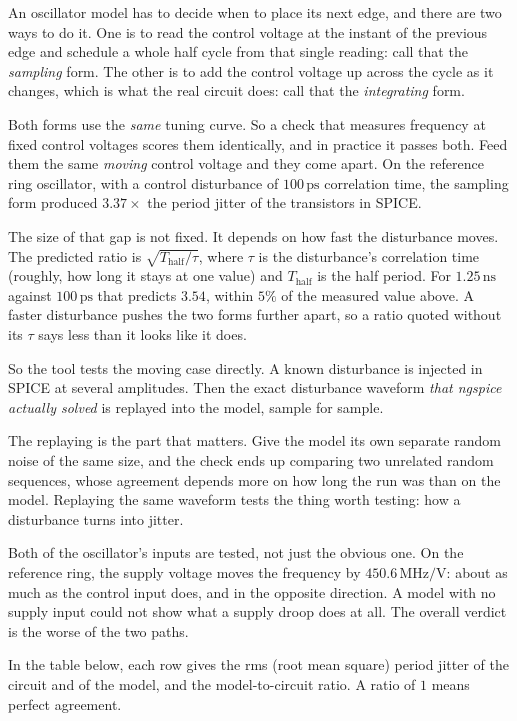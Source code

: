 \documentclass[11pt,a4paper]{article}
\newcommand{\unit}[1]{\,\textrm{#1}}
\begin{document}
An oscillator model has to decide when to place its next edge, and
there are two ways to do it. One is to read the control voltage at the
instant of the previous edge and schedule a whole half cycle from that
single reading: call that the \emph{sampling} form. The other is to
add the control voltage up across the cycle as it changes, which is
what the real circuit does: call that the \emph{integrating} form.

Both forms use the \emph{same} tuning curve. So a check that measures
frequency at fixed control voltages scores them identically, and in
practice it passes both. Feed them the same \emph{moving} control
voltage and they come apart. On the reference ring oscillator, with a
control disturbance of $100\unit{ps}$ correlation time, the sampling
form produced $3.37\times$ the period jitter of the transistors in
SPICE.

The size of that gap is not fixed. It depends on how fast the
disturbance moves. The predicted ratio is
$\sqrt{T_{\mathrm{half}}/\tau}$, where $\tau$ is the disturbance's
correlation time (roughly, how long it stays at one value) and
$T_{\mathrm{half}}$ is the half period. For $1.25\unit{ns}$ against
$100\unit{ps}$ that predicts $3.54$, within $5\%$ of the measured
value above. A faster disturbance pushes the two forms further apart,
so a ratio quoted without its $\tau$ says less than it looks like it
does.

So the tool tests the moving case directly. A known disturbance is
injected in SPICE at several amplitudes. Then the exact disturbance
waveform \emph{that ngspice actually solved} is replayed into the
model, sample for sample.

The replaying is the part that matters. Give the model its own
separate random noise of the same size, and the check ends up
comparing two unrelated random sequences, whose agreement depends more
on how long the run was than on the model. Replaying the same waveform
tests the thing worth testing: how a disturbance turns into jitter.

Both of the oscillator's inputs are tested, not just the obvious one.
On the reference ring, the supply voltage moves the frequency by
$450.6\unit{MHz/V}$: about as much as the control input does, and in
the opposite direction. A model with no supply input could not show
what a supply droop does at all. The overall verdict is the worse of
the two paths.

In the table below, each row gives the rms (root mean square) period
jitter of the circuit and of the model, and the model-to-circuit
ratio. A ratio of $1$ means perfect agreement.
\end{document}
